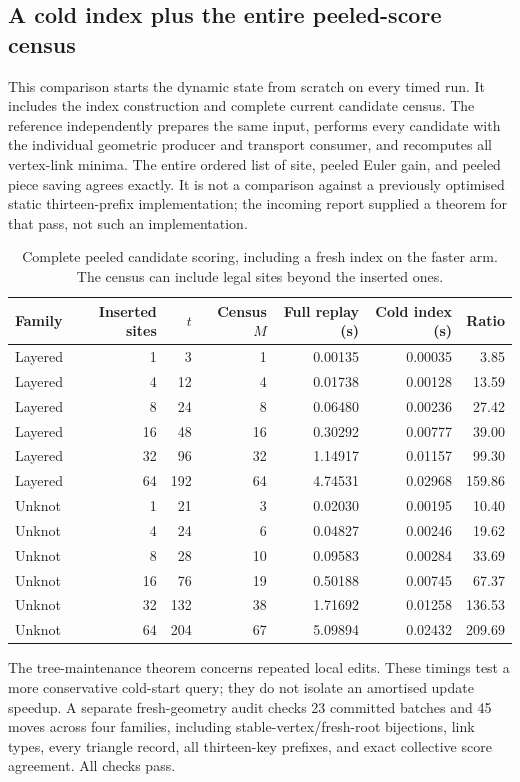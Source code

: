 \subsection{A cold index plus the entire peeled-score census}

This comparison starts the dynamic state from scratch on every timed run.
It includes the index construction and complete current candidate census.
The reference independently prepares the same input, performs every
candidate with the individual geometric producer and transport consumer,
and recomputes all vertex-link minima. The entire ordered list of site,
peeled Euler gain, and peeled piece saving agrees exactly. It is not a
comparison against a previously optimised static thirteen-prefix
implementation; the incoming report supplied a theorem for that pass,
not such an implementation.

\begin{table}[htbp]
\centering\small
\begin{tabular}{lrrrrrr}
\toprule
Family & Inserted sites & $t$ & Census $M$ & Full replay (s)& Cold index (s)& Ratio\\
\midrule
Layered &1&3&1&0.00135&0.00035&3.85\\
Layered &4&12&4&0.01738&0.00128&13.59\\
Layered &8&24&8&0.06480&0.00236&27.42\\
Layered &16&48&16&0.30292&0.00777&39.00\\
Layered &32&96&32&1.14917&0.01157&99.30\\
Layered &64&192&64&4.74531&0.02968&159.86\\
\midrule
Unknot &1&21&3&0.02030&0.00195&10.40\\
Unknot &4&24&6&0.04827&0.00246&19.62\\
Unknot &8&28&10&0.09583&0.00284&33.69\\
Unknot &16&76&19&0.50188&0.00745&67.37\\
Unknot &32&132&38&1.71692&0.01258&136.53\\
Unknot &64&204&67&5.09894&0.02432&209.69\\
\bottomrule
\end{tabular}
\caption{Complete peeled candidate scoring, including a fresh index on
the faster arm. The census can include legal sites beyond the inserted ones.}
\label{tab:peeling}
\end{table}

The tree-maintenance theorem concerns repeated local edits. These timings
test a more conservative cold-start query; they do not isolate an amortised
update speedup. A separate fresh-geometry audit checks 23 committed batches
and 45 moves across four families, including stable-vertex/fresh-root
bijections, link types, every triangle record, all thirteen-key prefixes,
and exact collective score agreement. All checks pass.

